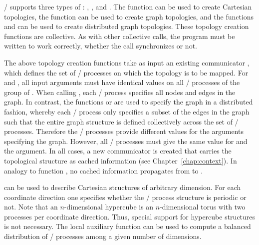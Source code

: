 \MPI/ supports three types of :
,
, and
.  
The function 
can be used to create Cartesian topologies, the function
 can be used to create graph topologies, and the
functions  and
 can be used to create distributed graph
topologies.
These topology creation functions are collective.  As with
other collective calls, the program must be written to work correctly,
whether the call synchronizes or not.

The above topology creation functions take as input an existing communicator
,
which defines the set of \MPI/ processes on which the topology is to be
mapped.
For  and ,
all input arguments must have identical
values on all \MPI/ processes of the group of .
When calling , each \MPI/ process specifies all
nodes and edges in the graph. In contrast, the functions
 or
 are used to
specify the graph in a distributed fashion, whereby each \MPI/ process only
specifies a subset of the edges in the graph such that the entire graph
structure is defined collectively across the set of \MPI/ processes.
Therefore the \MPI/ processes provide different values for the
arguments specifying the graph. However, all \MPI/ processes must give the
same value for  and the  argument. In all cases, a
new communicator  is created that
carries the topological structure as cached information (see
Chapter~\ref{chap:context}). In analogy to function
, no cached information propagates from
 to .

 can be used to describe Cartesian structures of
arbitrary dimension. For each coordinate direction one specifies whether the
\MPI/ process structure is periodic or not.
Note that an $n$-dimensional hypercube is
an $n$-dimensional torus with two processes per coordinate direction. Thus,
special support for hypercube structures is not necessary.  The local
auxiliary function  can be used to compute a balanced
distribution of \MPI/ processes among a given number of dimensions.

